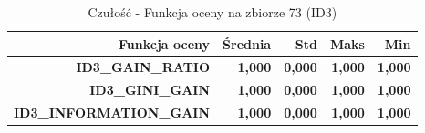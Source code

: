 \begin{table}[htbp]
\centering
\small
\setlength{\tabcolsep}{6pt}
\renewcommand{\arraystretch}{1.2}
\caption{Czułość - Funkcja oceny na zbiorze 73 (ID3)}
\label{tab:ID3_eval_function_73_recall}
\begin{tabular}{r|r|r|r|r}
\toprule
Funkcja oceny & Średnia & Std & Maks & Min \\
\hline
\textbf{ID3\_GAIN\_RATIO} & \textbf{1,000} & \textbf{0,000} & \textbf{1,000} & \textbf{1,000} \\
\textbf{ID3\_GINI\_GAIN} & \textbf{1,000} & \textbf{0,000} & \textbf{1,000} & \textbf{1,000} \\
\textbf{ID3\_INFORMATION\_GAIN} & \textbf{1,000} & \textbf{0,000} & \textbf{1,000} & \textbf{1,000} \\
\bottomrule
\end{tabular}
\end{table}